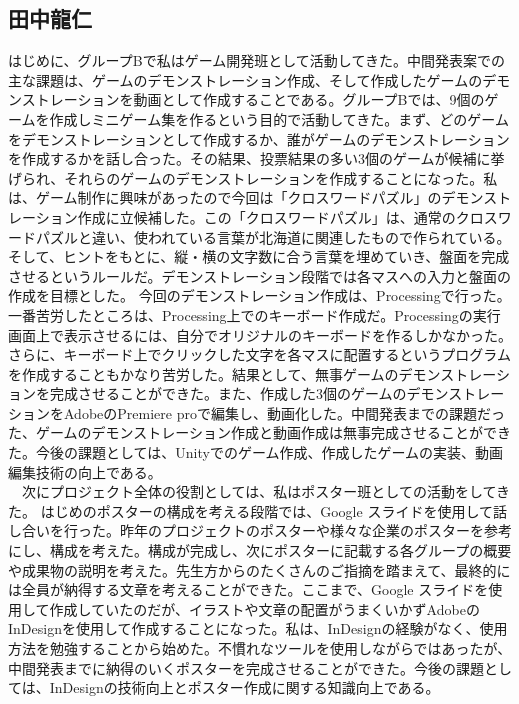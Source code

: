 \subsection{田中龍仁}
はじめに、グループBで私はゲーム開発班として活動してきた。中間発表案での主な課題は、ゲームのデモンストレーション作成、そして作成したゲームのデモンストレーションを動画として作成することである。グループBでは、9個のゲームを作成しミニゲーム集を作るという目的で活動してきた。まず、どのゲームをデモンストレーションとして作成するか、誰がゲームのデモンストレーションを作成するかを話し合った。その結果、投票結果の多い3個のゲームが候補に挙げられ、それらのゲームのデモンストレーションを作成することになった。私は、ゲーム制作に興味があったので今回は「クロスワードパズル」のデモンストレーション作成に立候補した。この「クロスワードパズル」は、通常のクロスワードパズルと違い、使われている言葉が北海道に関連したもので作られている。そして、ヒントをもとに、縦・横の文字数に合う言葉を埋めていき、盤面を完成させるというルールだ。デモンストレーション段階では各マスへの入力と盤面の作成を目標とした。
今回のデモンストレーション作成は、Processingで行った。一番苦労したところは、Processing上でのキーボード作成だ。Processingの実行画面上で表示させるには、自分でオリジナルのキーボードを作るしかなかった。さらに、キーボード上でクリックした文字を各マスに配置するというプログラムを作成することもかなり苦労した。結果として、無事ゲームのデモンストレーションを完成させることができた。また、作成した3個のゲームのデモンストレーションをAdobeのPremiere proで編集し、動画化した。中間発表までの課題だった、ゲームのデモンストレーション作成と動画作成は無事完成させることができた。今後の課題としては、Unityでのゲーム作成、作成したゲームの実装、動画編集技術の向上である。\\
　次にプロジェクト全体の役割としては、私はポスター班としての活動をしてきた。
はじめのポスターの構成を考える段階では、Google スライドを使用して話し合いを行った。昨年のプロジェクトのポスターや様々な企業のポスターを参考にし、構成を考えた。構成が完成し、次にポスターに記載する各グループの概要や成果物の説明を考えた。先生方からのたくさんのご指摘を踏まえて、最終的には全員が納得する文章を考えることができた。ここまで、Google スライドを使用して作成していたのだが、イラストや文章の配置がうまくいかずAdobeのInDesignを使用して作成することになった。私は、InDesignの経験がなく、使用方法を勉強することから始めた。不慣れなツールを使用しながらではあったが、中間発表までに納得のいくポスターを完成させることができた。今後の課題としては、InDesignの技術向上とポスター作成に関する知識向上である。

